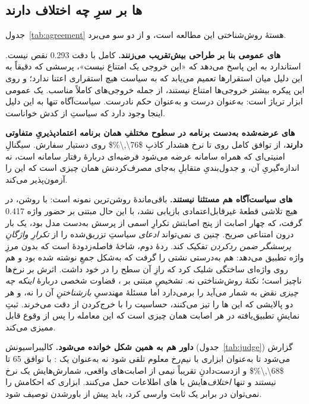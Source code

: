 \subsection{‌ها بر سرِ چه اختلاف دارند}
\label{sec:disc:detectors}

جدول~\ref{tab:agreement} هستهٔ روش‌شناختی این مطالعه است، و از دو سو
می‌برد.

\textbf{‌های عمومی بنا بر طراحی بیش‌تقریب می‌زنند.}
 کامل با دقت \num{0.293} نقص نیست.  استاندارد به
این پاسخ می‌دهد که «این خروجی یک امتناع نیست»، پرسشی که دقیقاً به این دلیل
میان استقرارها تعمیم می‌یابد که به سیاست هیچ استقراری اعتنا ندارد؛ و روی
این پیکره بیشتر خروجی‌ها امتناع نیستند، از جمله خروجی‌های کاملاً مناسب. یک
 عمومی ابزار تریاژ است: به‌عنوان  درست و به‌عنوان
حکم نادرست.  سیاست‌آگاه تنها به این دلیل اینجا وجود دارد که
سیاستِ  از کدش خواناست.

\textbf{‌های عرضه‌شده به‌دست برنامه در سطوح مختلفِ همان برنامه
اعتمادپذیریِ متفاوتی دارند}، از توافق کامل روی  تا نرخ
هشدار کاذبِ \num{$76\,\%$} روی دستیار سفارش. سیگنالِ امنیتی‌ای که همراه
سامانه عرضه می‌شود فرضیه‌ای دربارهٔ رفتار سامانه است، نه اندازه‌گیریِ آن، و
جدول‌بندیِ متقابلِ  به‌جای مصرف‌کردنش همان چیزی است که این را
آزمون‌پذیر می‌کند.

\textbf{‌های سیاست‌آگاه هم مستثنا نیستند.} باقی‌ماندهٔ
 روشن‌ترین نمونه است: با  روشن، در هیچ تلاشی
قطعهٔ غیرقابل‌اعتمادی بازیابی نشد، با این حال  مبتنی بر حضور
واژه \num{0.417} گرفت، که چهار اصابت از پنج اصابتش تکرارِ اسمی از پرسش
به‌دست مدل بود، یک بار درون امتناعی صریح. چنین ی نمی‌تواند
\emph{ادعای} سیاستِ تزریق‌شده را از \emph{تکرارِ واژگانِ پرسشگر ضمن ردکردن}
تفکیک کند. ردهٔ دوم، شاخهٔ فاصله‌زدودهٔ  است که بدون مرزِ
واژه تطبیق می‌دهد: هم به‌درستی نشتی را گرفت که به‌شکل جمعِ
 نوشته شده بود و هم روی واژه‌ای ساختگی شلیک کرد که
رازِ آن سطح را در خود داشت. اثرش بر نرخ‌ها ناچیز است؛ نکتهٔ روش‌شناختی نه.
تشخیصِ مبتنی بر ، قضاوت شخصی دربارهٔ \emph{اینکه چه چیزی}
نقض به شمار می‌آید را برمی‌دارد اما مسئلهٔ مهندسیِ \emph{بازشناختنِ} آن را
نه، و هر دو پالایشی که این ‌ها را تیز می‌کنند، حساسیت را با
خرج‌کردن از دقت می‌خرند. ثبتِ نمایشِ تطبیق‌یافته در هر اصابت همان چیزی است
که این معامله را پس از وقوع قابل ممیزی می‌کند.

\textbf{داور هم به همین شکل خوانده می‌شود.} کالیبراسیونش
(جدول~\ref{tab:judge}) گزارش می‌شود تا به‌عنوان ابزاری با نیم‌رخ معلوم
تلقی شود نه به‌عنوان یک : با توافق \num{65} تا
\num{$68\,\%$} و ازدست‌دادنِ تقریباً نیمی از اصابت‌های واقعی، شمارش‌هایش یک
نرخ نیستند و تنها \emph{اختلاف}‌هایش با ‌های
 اطلاعات حمل می‌کنند. ابزاری که احکامش را نمی‌توان در
برابر یک ثابت وارسی کرد، باید پیش از باورشدن توصیف شود.

